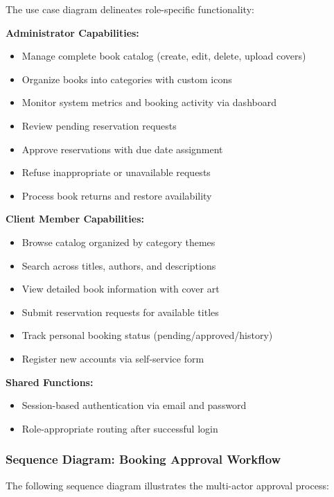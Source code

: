 \documentclass[12pt,a4paper]{article}
\begin{document}
\clearpage

The use case diagram delineates role-specific functionality:

\textbf{Administrator Capabilities:}
\begin{itemize}[leftmargin=*]
\item Manage complete book catalog (create, edit, delete, upload covers)
\item Organize books into categories with custom icons
\item Monitor system metrics and booking activity via dashboard
\item Review pending reservation requests
\item Approve reservations with due date assignment
\item Refuse inappropriate or unavailable requests
\item Process book returns and restore availability
\end{itemize}

\textbf{Client Member Capabilities:}
\begin{itemize}[leftmargin=*]
\item Browse catalog organized by category themes
\item Search across titles, authors, and descriptions
\item View detailed book information with cover art
\item Submit reservation requests for available titles
\item Track personal booking status (pending/approved/history)
\item Register new accounts via self-service form
\end{itemize}

\textbf{Shared Functions:}
\begin{itemize}[leftmargin=*]
\item Session-based authentication via email and password
\item Role-appropriate routing after successful login
\end{itemize}

\subsubsection{Sequence Diagram: Booking Approval Workflow}

The following sequence diagram illustrates the multi-actor approval process:
\end{document}
